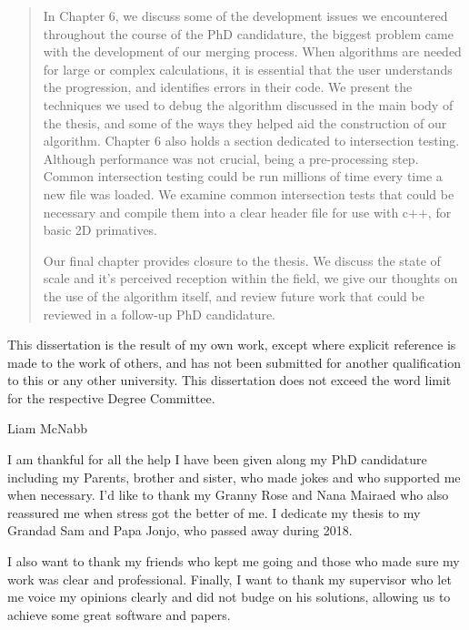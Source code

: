 \begin{abstract}
In Chapter 6, we discuss some of the development issues we encountered throughout the course of the PhD candidature, the biggest problem came with the development of our merging process. When algorithms are needed for large or complex calculations, it is essential that the user understands the progression, and identifies errors in their code. We present the techniques we used to debug the algorithm discussed in the main body of the thesis, and some of the ways they helped aid the construction of our algorithm. Chapter 6 also holds a section dedicated to intersection testing. Although performance was not crucial, being a pre-processing step. Common intersection testing could be run millions of time every time a new file was loaded. We examine common intersection tests that could be necessary  and compile them into a clear header file for use with c++, for basic 2D primatives. 

Our final chapter provides closure to the thesis. We discuss the state of scale and it's perceived reception within the field, we give our thoughts on the use of the algorithm itself, and review future work that could be reviewed in a follow-up PhD candidature.

\end{abstract}
\begin{declaration}
  This dissertation is the result of my own work, except where explicit
  reference is made to the work of others, and has not been submitted
  for another qualification to this or any other university. This
  dissertation does not exceed the word limit for the respective Degree
  Committee.
  \vspace*{1cm}
  \begin{flushright}
    Liam McNabb
  \end{flushright}
\end{declaration}


\begin{acknowledgements}
  I am thankful for all the help I have been given along my PhD candidature including my Parents, brother and sister, who made jokes and who supported me when necessary. I'd like to thank my Granny Rose and Nana Mairaed who also reassured me when stress got the better of me. I dedicate my thesis to my Grandad Sam and Papa Jonjo, who passed away during 2018.
  
I also want to thank my friends who kept me going and those who made sure my work was clear and professional. Finally, I want to thank my supervisor who let me voice my opinions clearly and did not budge on his solutions, allowing us to achieve some great software and papers.
  
\end{acknowledgements}


